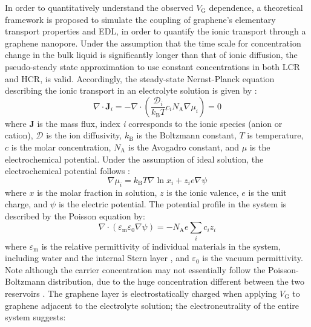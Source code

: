 In order to quantitatively understand the observed $V_{\mathrm{G}}$
dependence, a theoretical framework is proposed to simulate the
coupling of graphene's elementary transport properties and EDL, in
order to quantify the ionic transport through a graphene
nanopore. Under the assumption that the time scale for concentration
change in the bulk liquid is significantly longer than
that of ionic diffusion, the pseudo-steady state approximation to use constant concentrations in both LCR and HCR, is valid.
%
Accordingly, the steady-state Nernst-Planck equation describing
the ionic transport in an electrolyte solution is given by
\cite{MacGillivray_1968_NPE}:
\begin{equation}
  \label{eq:np-pnp}
  \nabla \cdot \symbf{J}_{i} = -\nabla \cdot (\frac{\mathcal{D}_{i}}{k_{\mathrm{B}}T} c_{i} N_{\mathrm{A}} \nabla \mu_{i}) = 0
\end{equation}
where $\symbf{J}$ is the mass flux, index \textit{i} corresponds to
the ionic species (anion or cation), $\mathcal{D}$ is the ion
diffusivity, $k_{\mathrm{B}}$ is the Boltzmann constant, $T$ is
temperature, $c$ is the molar concentration, $N_{\mathrm{A}}$ is the
Avogadro constant, and $\mu$ is the electrochemical potential. Under
the assumption of ideal solution, the electrochemical potential
follows \cite{Kilic_2007_steric_effect_ion}:
\begin{equation}
  \label{eq:np-mu}
  \nabla \mu_{i} = k_{\mathrm{B}} T \nabla \ln x_{i} + z_{i} e \nabla \psi
\end{equation}
where $x$ is the molar fraction in solution, $z$ is the ionic valence,
$e$ is the unit charge, and $\psi$ is the electric potential.
%
The potential profile in the system is described by the Poisson
equation by:
\begin{equation}
  \label{eq:np-poisson}
  \nabla \cdot (\varepsilon_{\mathrm{m}} \varepsilon_{0} \nabla \psi)
  =
  - N_{\mathrm{A}} e \sum_{i} c_{i} z_{i}
\end{equation}
where $\varepsilon_{\mathrm{m}}$ is the relative permittivity of
individual materials in the system, including water and the internal
Stern layer , and $\varepsilon_{0}$ is
the vacuum permittivity.
%
Note although the carrier concentration may not essentially follow the
Poisson-Boltzmann distribution, due to the huge concentration different between the two reservoirs .
%
The graphene layer is electrostatically charged when
applying $V_{\mathrm{G}}$ to graphene adjacent to the electrolyte
solution; the electroneutrality of the entire system suggests:
